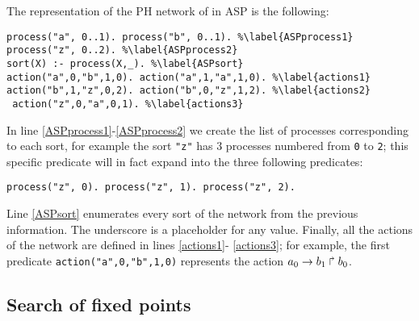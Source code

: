 \begin{example}
\label{ex:asp-ph}
The representation of the PH network of  in ASP is the following:
\begin{lstlisting}
process("a", 0..1). process("b", 0..1). %\label{ASPprocess1}
process("z", 0..2). %\label{ASPprocess2}
sort(X) :- process(X,_). %\label{ASPsort}
action("a",0,"b",1,0). action("a",1,"a",1,0). %\label{actions1}
action("b",1,"z",0,2). action("b",0,"z",1,2). %\label{actions2}
 action("z",0,"a",0,1). %\label{actions3}
\end{lstlisting}
In line \ref{ASPprocess1}-\ref{ASPprocess2} we create the list of processes corresponding to each sort,
for example the sort \texttt{"z"} has 3 processes numbered from \texttt{0} to \texttt{2};
this specific predicate will in fact expand into the three following predicates:
\begin{lstlisting}[numbers=none]
process("z", 0). process("z", 1). process("z", 2).
\end{lstlisting}
Line \ref{ASPsort} enumerates every sort of the network from the previous information.
The underscore is a placeholder for any value.
Finally, all the actions of the network are defined in lines \ref{actions1}- \ref{actions3};
for example, the first predicate \texttt{action("a",0,"b",1,0)} represents the action
$a_0\rightarrow b_1\Rsh b_0$.
\end{example}

\subsection{Search of fixed points}

